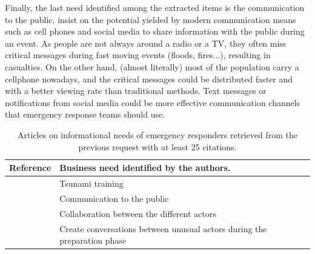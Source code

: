 Finally, the last need identified among the extracted items is the communication to the public.
\textcite{aloudatRegulationUbiquitousMobile2011a} insist on the potential yielded by modern communication means such as cell phones and social media to share information with the public during an event.
As people are not always around a radio or a TV, they often miss critical messages during fast moving events (floods, fires...), resulting in casualties.
On the other hand, (almost literally) most of the population carry a cellphone nowadays, and the critical messages could be distributed faster and with a better viewing rate than traditional methods.
Text messages or notifications from social media could be more effective communication channels that emergency response teams should use.

\begin{table}[bp]
    \centering
    \renewcommand{\arraystretch}{1.5}
    \caption{Articles on informational needs of emergency responders retrieved from the previous request with at least 25 citations.}
    \begin{tabular}{m{} m{}}
        Reference                                                    & Business need identified by the authors.                                                                                                                                                                               \\ [0.5ex]
        \toprule
        \cite{lindellTsunamiPreparednessOregon2010a}                 & Tsunami training                                                                                                                                                                                                       \\
        \cite{aloudatRegulationUbiquitousMobile2011a}                & Communication to the public                                                                                                                                                                                            \\
        \cite{berlinWhyCollaborationMinimised2011a}                  & Collaboration between the different actors                                                                                                                                                                             \\
        \cite{parkerSurfaceWaterFlood2011a}                          & Create conversations between unusual actors during the preparation phase                                                                                                                                               \\

\end{tabular}
\end{table}
